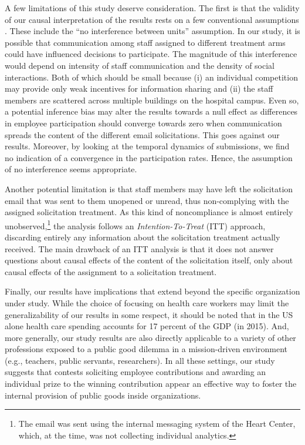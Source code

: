 \documentclass[11pt]{article}
\begin{document}
A few limitations of this study deserve consideration. The first is that
the validity of our causal interpretation of the results rests on a few
conventional assumptions \citep{rubin1974estimating}. These include the
``no interference between units'' assumption. In our study, it is
possible that communication among staff assigned to different treatment
arms could have influenced decisions to participate. The magnitude of
this interference would depend on intensity of staff communication and
the density of social interactions. Both of which should be small
because (i) an individual competition may provide only weak incentives
for information sharing and (ii) the staff members are scattered across
multiple buildings on the hospital campus. Even so, a potential
inference bias may alter the results towards a null effect as
differences in employee participation should converge towards zero when
communication spreads the content of the different email solicitations.
This goes against our results. Moreover, by looking at the temporal
dynamics of submissions, we find no indication of a convergence in the
participation rates. Hence, the assumption of no interference seems
appropriate.

Another potential limitation is that staff members may have left the
solicitation email that was sent to them unopened or unread, thus
non-complying with the assigned solicitation treatment. As this kind of
noncompliance is almost entirely unobserved,\footnote{The email was sent
  using the internal messaging system of the Heart Center, which, at the
  time, was not collecting individual analytics.} the analysis follows
an \emph{Intention-To-Treat} (ITT) approach, discarding entirely any
information about the solicitation treatment actually received. The main
drawback of an ITT analysis is that it does not answer questions about
causal effects of the content of the solicitation itself, only about
causal effects of the assignment to a solicitation treatment.

Finally, our results have implications that extend beyond the specific
organization under study. While the choice of focusing on health care
workers may limit the generalizability of our results in some respect,
it should be noted that in the US alone health care spending accounts
for 17 percent of the GDP (in 2015). And, more generally, our study
results are also directly applicable to a variety of other professions
exposed to a public good dilemma in a mission-driven environment (e.g.,
teachers, public servants, researchers). In all these settings, our
study suggests that contests soliciting employee contributions and
awarding an individual prize to the winning contribution appear an
effective way to foster the internal provision of public goods inside
organizations.

\renewcommand\refname{References}

\end{document}
